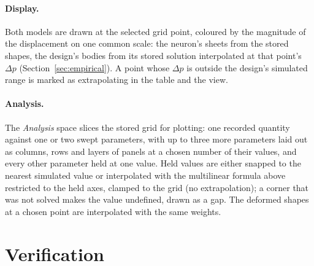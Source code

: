 \documentclass[11pt,a4paper]{article}
\theoremstyle{remark}
\begin{document}
\paragraph{Display.} Both models are drawn at the selected grid point, coloured by the magnitude
of the displacement on one common scale: the neuron's sheets from the stored shapes, the design's
bodies from its stored solution interpolated at that point's $\Delta p$
(Section~\ref{sec:empirical}). A point whose $\Delta p$ is outside the design's simulated range is
marked as extrapolating in the table and the view.

\paragraph{Analysis.} The \emph{Analysis} space slices the stored grid for plotting: one recorded
quantity against one or two swept parameters, with up to three more parameters laid out as columns,
rows and layers of panels at a chosen number of their values, and every other parameter held at one
value. Held values are either snapped to the nearest simulated value or interpolated with the
multilinear formula above restricted to the held axes, clamped to the grid (no extrapolation); a
corner that was not solved makes the value undefined, drawn as a gap. The deformed shapes at a chosen
point are interpolated with the same weights.

\section{Verification}\label{sec:verification}
\end{document}

